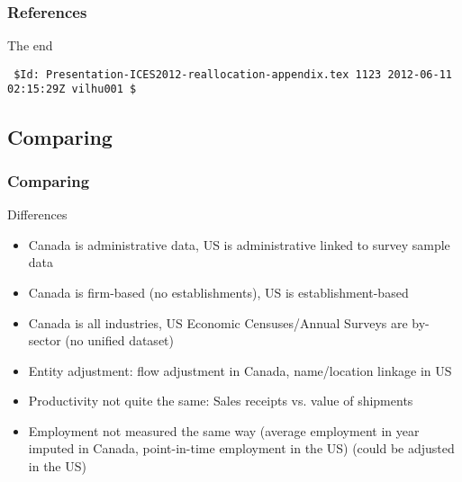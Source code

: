 
 

\begin{slide}
\frametitle{References}
\tiny
 

\end{slide}
\ifpdf
{}
\fi




%
%

\begin{frame}[fragile]
{\huge The end}
\vfill
\verbatimsize
\begin{verbatim}
 $Id: Presentation-ICES2012-reallocation-appendix.tex 1123 2012-06-11 02:15:29Z vilhu001 $
\end{verbatim}
\end{frame}




\subsection{Comparing}


\begin{slide}
\frametitle{Comparing}
\begin{block}{Differences}
\begin{itemize}[<+->]
\item Canada is administrative data, US is administrative linked to survey sample data
\item Canada is firm-based (no establishments), US is establishment-based
\item Canada is all industries, US Economic Censuses/Annual Surveys are by-sector (no unified dataset)
\item Entity adjustment: flow adjustment in Canada, name/location linkage in US
\item Productivity not quite the same: Sales receipts vs. value of shipments
\item Employment not measured the same way (average employment in year imputed in Canada, point-in-time employment in the US) \pause (could be adjusted in the US)
\end{itemize}
\end{block}
\end{slide}
